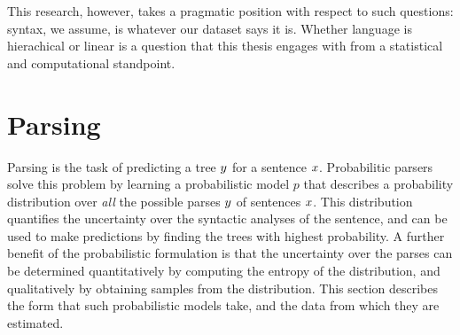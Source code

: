 This research, however, takes a pragmatic position with respect to such questions: syntax, we assume, is whatever our dataset says it is. Whether language is hierachical or linear is a question that this thesis engages with from a statistical and computational standpoint.

% 		  
%
% 		  
%

\section{Parsing}
  Parsing is the task of predicting a tree $y$ for a sentence $x$. Probabilitic parsers solve this problem by learning a probabilistic model $p$ that describes a probability distribution over \textit{all} the possible parses $y$ of sentences $x$. This distribution quantifies the uncertainty over the syntactic analyses of the sentence, and can be used to make predictions by finding the trees with highest probability. A further benefit of the probabilistic formulation is that the uncertainty over the parses can be determined quantitatively by computing the entropy of the distribution, and qualitatively by obtaining samples from the distribution. This section describes the form that such probabilistic models take, and the data from which they are estimated.

